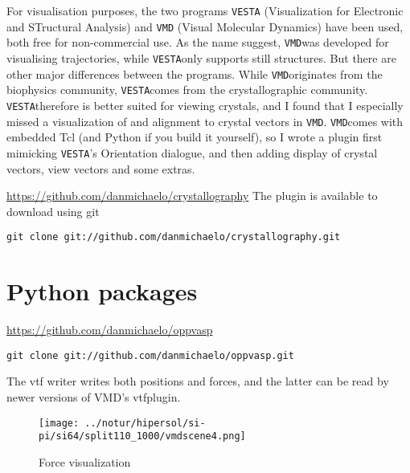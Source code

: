\documentclass[11pt,bibliography=totoc,index=totoc]{scrbook}   %
\newcommand{\vesta}{{\texttt{VESTA}}} %
\newcommand{\vmd}{{\texttt{VMD}}} %
\begin{document}
For visualisation purposes, the two programs {\vesta} (Visualization for Electronic and STructural Analysis) and {\vmd} (Visual Molecular Dynamics) have been used, both free for non-commercial use.
As the name suggest, \vmd was developed for visualising trajectories, while \vesta only supports still structures.
But there are other major differences between the programs. While \vmd originates from the biophysics community, \vesta comes from the crystallographic community.
\vesta therefore is better suited for viewing crystals, and I found that I especially missed a visualization of and alignment to crystal vectors in \vmd.
\vmd comes with embedded Tcl (and Python if you build it yourself), so I wrote a plugin first mimicking \vesta's Orientation dialogue, and then adding 
display of crystal vectors, view vectors and some extras.

\url{https://github.com/danmichaelo/crystallography}
The plugin is available to download using git
\lstset{language=Bash}
\begin{lstlisting}
git clone git://github.com/danmichaelo/crystallography.git
\end{lstlisting}

\section{Python packages}

\url{https://github.com/danmichaelo/oppvasp}
\begin{lstlisting}
git clone git://github.com/danmichaelo/oppvasp.git
\end{lstlisting}

The vtf writer writes both positions and forces, and the latter can be read by newer versions of VMD's vtfplugin.

\begin{figure}[htp]
  \centering
  \texttt{[image: ../notur/hipersol/si-pi/si64/split110\_1000/vmdscene4.png]}
  \caption{Force visualization}
  \label{fig:forceviz}
\end{figure}



\end{document}
